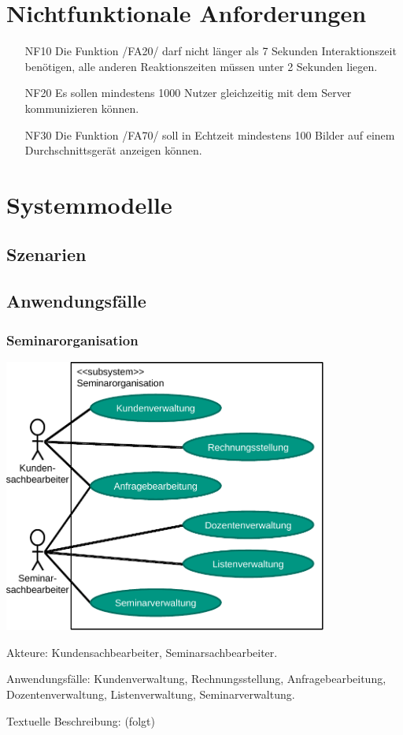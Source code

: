 \documentclass[parskip=full]{scrartcl}
\begin{document}
\section{Nichtfunktionale Anforderungen}
\begin{itemize}[nosep]
\item[NF10] Die Funktion /FA20/ darf nicht länger als 7 Sekunden Interaktionszeit benötigen, alle anderen Reaktionszeiten müssen unter 2 Sekunden liegen.
\item[NF20] Es sollen mindestens 1000 Nutzer gleichzeitig mit dem Server kommunizieren können.
\item[NF30] Die Funktion /FA70/ soll in Echtzeit mindestens 100 Bilder auf einem Durchschnittsgerät anzeigen können.
\end{itemize}

\section{Systemmodelle}

\subsection{Szenarien}

\subsection{Anwendungsfälle}
\subsubsection{Seminarorganisation}
\begin{center}
\includegraphics[width=0.8\textwidth]{szenario_seminarorganisation.pdf}
\end{center}

Akteure: Kundensachbearbeiter, Seminarsachbearbeiter.

Anwendungsfälle: Kundenverwaltung, Rechnungsstellung, Anfragebearbeitung, Dozentenverwaltung, Listenverwaltung, Seminarverwaltung.

Textuelle Beschreibung: (folgt)
\end{document}
